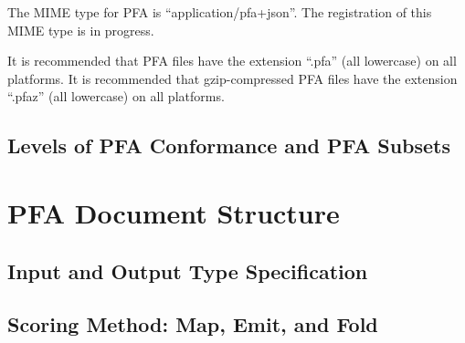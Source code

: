\documentclass{article}
\begin{document}
The MIME type for PFA is ``application/pfa+json''.  The registration of this MIME type is in progress.

It is recommended that PFA files have the extension ``.pfa'' (all lowercase) on all platforms.  It is recommended that gzip-compressed PFA files have the extension ``.pfaz'' (all lowercase) on all platforms.

\subsection{Levels of PFA Conformance and PFA Subsets}


\pagebreak

\section{PFA Document Structure}

\subsection{Input and Output Type Specification}

\subsection{Scoring Method: Map, Emit, and Fold}
\end{document}

